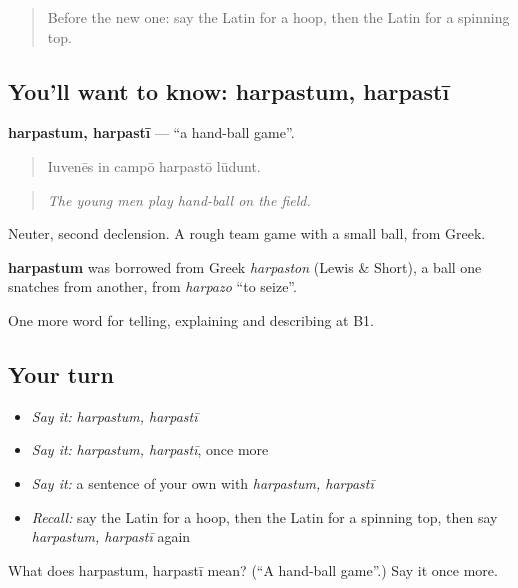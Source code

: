 \begin{quote}
Before the new one: say the Latin for a hoop, then the Latin for a spinning top.
\end{quote}

\subsection*{You'll want to know: harpastum, harpastī}
\textbf{harpastum, harpastī} — \textquotedblleft{}a hand-ball game\textquotedblright{}.

\begin{quote}
Iuvenēs in campō harpastō lūdunt.
\end{quote}

\begin{quote}
\emph{The young men play hand-ball on the field.}
\end{quote}

Neuter, second declension. A rough team game with a small ball, from Greek.

\begin{cousinweb}
\textbf{harpastum} was borrowed from Greek \emph{harpaston} (Lewis \& Short), a ball one snatches from another, from \emph{harpazo} \textquotedblleft{}to seize\textquotedblright{}.
\end{cousinweb}

\begin{grammarlens}[title={What you've built}]
One more word for telling, explaining and describing at B1.
\end{grammarlens}

\subsection*{Your turn}
\begin{itemize}
\raggedright
  \item \emph{Say it:} \emph{harpastum, harpastī}
  \item \emph{Say it:} \emph{harpastum, harpastī}, once more
  \item \emph{Say it:} a sentence of your own with \emph{harpastum, harpastī}
  \item \emph{Recall:} say the Latin for a hoop, then the Latin for a spinning top, then say \emph{harpastum, harpastī} again
\end{itemize}

\begin{tcolorbox}[breakable,colback=teal!4,colframe=teal!35!black,title={Before you move on}]
What does harpastum, harpastī mean? (\textquotedblleft{}A hand-ball game\textquotedblright{}.) Say it once more.
\end{tcolorbox}

